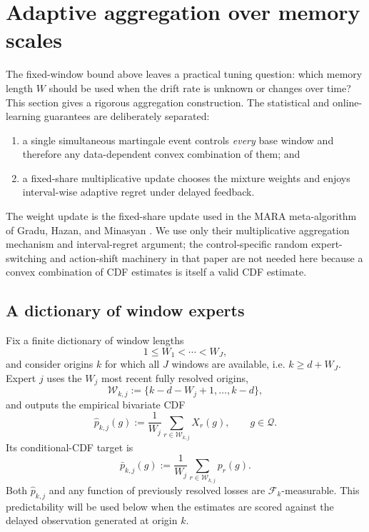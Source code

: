 \documentclass[11pt]{article}
\newcommand{\F}{\mathcal{F}}
\newcommand{\Q}{\mathcal{Q}}
\newcommand{\1}{\mathbf{1}}
\begin{document}
\section{Adaptive aggregation over memory scales}
\label{sec:adaptive-aggregation}

The fixed-window bound above leaves a practical tuning question: which memory
length $W$ should be used when the drift rate is unknown or changes over time?
This section gives a rigorous aggregation construction.  The statistical and
online-learning guarantees are deliberately separated:
\begin{enumerate}[leftmargin=*]
    \item a single simultaneous martingale event controls \emph{every} base
    window and therefore any data-dependent convex combination of them; and
    \item a fixed-share multiplicative update chooses the mixture weights and
    enjoys interval-wise adaptive regret under delayed feedback.
\end{enumerate}
The weight update is the fixed-share update used in the MARA meta-algorithm of
Gradu, Hazan, and Minasyan \cite{gradu2023}.  We use only their multiplicative
aggregation mechanism and interval-regret argument; the control-specific
random expert-switching and action-shift machinery in that paper are not
needed here because a convex combination of CDF estimates is itself a valid
CDF estimate.

\subsection{A dictionary of window experts}

Fix a finite dictionary of window lengths
\[
    1\le W_1<\cdots<W_J,
\]
and consider origins $k$ for which all $J$ windows are available, i.e.
$k\ge d+W_J$.  Expert $j$ uses the $W_j$ most recent fully resolved origins,
\begin{equation}
    \mathcal W_{k,j}
    :=
    \{k-d-W_j+1,\ldots,k-d\},
\end{equation}
and outputs the empirical bivariate CDF
\begin{equation}
    \widehat p_{k,j}(g)
    :=
    \frac1{W_j}
    \sum_{r\in\mathcal W_{k,j}} X_r(g),
    \qquad g\in\Q.
    \label{eq:base-window-expert}
\end{equation}
Its conditional-CDF target is
\begin{equation}
    \bar p_{k,j}(g)
    :=
    \frac1{W_j}
    \sum_{r\in\mathcal W_{k,j}} p_r(g).
    \label{eq:base-window-target}
\end{equation}
Both $\widehat p_{k,j}$ and any function of previously resolved losses are
$\F_k$-measurable.  This predictability will be used below when the estimates
are scored against the delayed observation generated at origin $k$.
\end{document}
